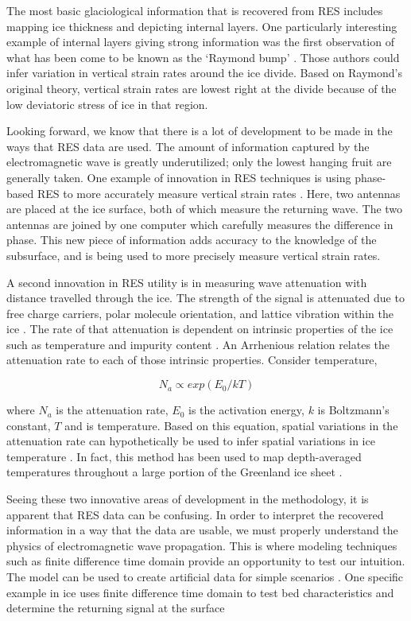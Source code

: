 \documentclass[a4paper]{article}
\begin{document}
The most basic glaciological information that is recovered from RES includes mapping ice thickness and depicting internal layers. One particularly interesting example of internal layers giving strong information was the first observation of what has been come to be known as the `Raymond bump' \citep{Vaughan1999}. Those authors could infer variation in vertical strain rates around the ice divide. Based on Raymond's original theory, vertical strain rates are lowest right at the divide because of the low deviatoric stress of ice in that region. 

Looking forward, we know that there is a lot of development to be made in the ways that RES data are used. The amount of information captured by the electromagnetic wave is greatly underutilized; only the lowest hanging fruit are generally taken. One example of innovation in RES techniques is using phase-based RES to more accurately measure vertical strain rates \citep{Nicholls2015,Kingslake2014}. Here, two antennas are placed at the ice surface, both of which measure the returning wave. The two antennas are joined by one computer which carefully measures the difference in phase. This new piece of information adds accuracy to the knowledge of the subsurface, and is being used to more precisely measure vertical strain rates.

A second innovation in RES utility is in measuring wave attenuation with distance travelled through the ice. The strength of the signal is attenuated due to free charge carriers, polar molecule orientation, and lattice vibration within the ice \citep{Dowdeswell2004}. The rate of that attenuation is dependent on intrinsic properties of the ice such as temperature and impurity content \citep{MacGregor2007}. An Arrhenious relation relates the attenuation rate to each of those intrinsic properties. Consider
temperature,

\begin{equation}
N_a \propto exp(E_0/kT)
\end{equation}

where $N_a$ is the attenuation rate, $E_0$ is the activation energy, $k$ is Boltzmann’s constant, $T$ and is temperature. Based on this equation, spatial variations in the attenuation rate can hypothetically be used to infer spatial variations in ice temperature \citep{MacGregor2012}. In fact, this method has been used to map depth-averaged temperatures throughout a large portion of the Greenland ice sheet \citep{Macgregor2015}.

Seeing these two innovative areas of development in the methodology, it is apparent that RES data can be confusing. In order to interpret the recovered information in a way that the data are usable, we must properly understand the physics of electromagnetic wave propagation. This is where modeling techniques such as finite difference time domain provide an opportunity to test our intuition. The model can be used to create artificial data for simple scenarios \citep{Irving2006}. One specific example in ice uses finite difference time domain to test bed characteristics and determine the returning signal at the surface \citep{Christianson2016}
\end{document}
